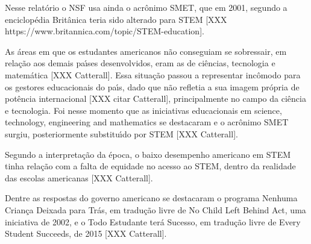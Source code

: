 \documentclass[
12pt,		%
openright,	%
twoside,  %
a4paper,			%
chapter=TITLE,		%
english,			%
french,				%
spanish,			%
brazil				%
]{USPSC-classe/USPSC_RedarTex}
\begin{document}
\noindent\begin{center}\mbox{\centering{}}\end{center}


Nesse relat\'orio o NSF usa ainda o acr\^onimo SMET, que em 2001, segundo a enciclop\'edia Brit\^anica teria sido alterado para STEM [XXX https://www.britannica.com/topic/STEM-education].








As \'areas em que os estudantes americanos n\~ao conseguiam se sobressair, em rela\c{c}\~ao aos demais pa\'{\i}ses desenvolvidos, eram as de ci\^encias, tecnologia e matem\'atica [XXX Catterall]. Essa situa\c{c}\~ao passou a representar inc\^omodo para os gestores educacionais do pa\'{\i}s, dado que n\~ao refletia a sua imagem pr\'opria de pot\^encia internacional [XXX citar Catterall], principalmente no campo da ci\^encia e tecnologia. Foi nesse momento que as iniciativas educacionais em \textquotedbl science, technology, engineering and mathematics se destacaram e o acr\^onimo SMET surgiu, posteriormente substitu\'{\i}do por STEM [XXX  Catterall].








Segundo a interpreta\c{c}\~ao da \'epoca, o baixo desempenho americano em STEM tinha rela\c{c}\~ao com a falta de equidade no acesso ao STEM, dentro da realidade das escolas americanas [XXX Catterall].








Dentre as respostas do governo americano se destacaram o programa \textquotedbl Nenhuma Crian\c{c}a Deixada para Tr\'as, em tradu\c{c}\~ao livre de \textquotedbl No Child Left Behind Act, uma iniciativa de 2002, e o \textquotedbl Todo Estudante ter\'a Sucesso, em tradu\c{c}\~ao livre de \textquotedbl Every Student Succeeds, de 2015 [XXX Catterall].
\end{document}
